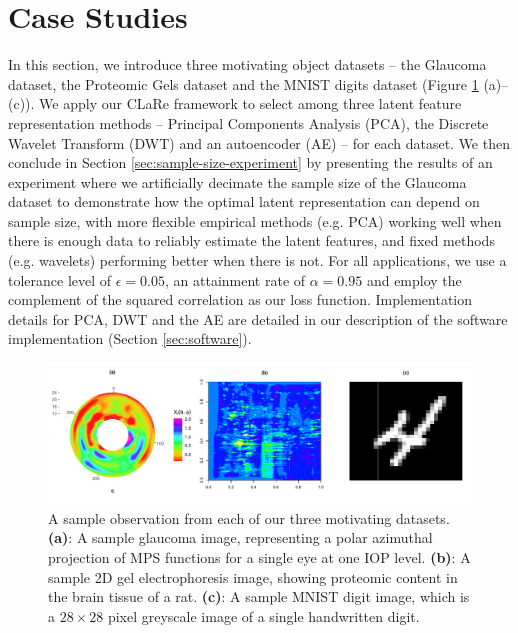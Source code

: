 \section{Case Studies}\label{sec:case-studies}

In this section, we introduce three motivating object datasets -- the Glaucoma dataset, the Proteomic Gels dataset and the MNIST digits dataset (Figure \ref{fig:combined-data-objects} (a)--(c)).
We apply our CLaRe framework to select among three latent feature representation methods -- Principal Components Analysis (PCA), the Discrete Wavelet Transform (DWT) and an autoencoder (AE) -- for each dataset.
We then conclude in Section \ref{sec:sample-size-experiment} by presenting the results of an experiment where we artificially decimate the sample size of the Glaucoma dataset to demonstrate how the optimal latent representation can depend on sample size, with more flexible empirical methods (e.g. PCA) working well when there is enough data to reliably estimate the latent features, and fixed methods (e.g. wavelets) performing better when there is not.
For all applications, we use a tolerance level of $\epsilon = 0.05$, an attainment rate of $\alpha=0.95$ and employ the complement of the squared correlation as our loss function.
Implementation details for PCA, DWT and the AE are detailed in our description of the software implementation (Section \ref{sec:software}).

\begin{figure}
    \centering
    \includegraphics[width=1\textwidth]{figures/data-plot.pdf}
    \caption{
    A sample observation from each of our three motivating datasets.
    \textbf{(a)}: A sample glaucoma image, representing a polar azimuthal projection of MPS functions for a single eye at one IOP level.
    \textbf{(b)}: A sample 2D gel electrophoresis image, showing proteomic content in the brain tissue of a rat.
    \textbf{(c)}: A sample MNIST digit image, which is a $28 \times 28$ pixel greyscale image of a single handwritten digit.}
    \label{fig:combined-data-objects}
\end{figure}



